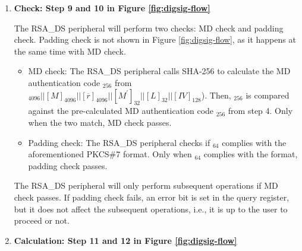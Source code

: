 \documentclass[main\_\_EN.tex]{subfiles}
\begin{document}
\begin{enumerate}
    \item {\bfseries Check: Step 9 and 10 in Figure \ref{fig:digsig-flow}}

        The RSA\_DS peripheral will perform two checks: MD check and padding check. Padding check is not shown in Figure \ref{fig:digsig-flow}, as it happens at the same time with MD check.


        \begin{itemize}

            \item MD check: The RSA\_DS peripheral calls SHA-256 to calculate the MD authentication code \begin{math}[CALC\_MD]_{256}\end{math} from \begin{math}
                [Y]_{4096} ||
                [M]_{4096} ||
                [\overline{r}]_{4096} ||
                [M^{\prime}]_{32} ||
                [L]_{32} ||
                [IV]_{128}
            \end{math}). Then, \begin{math}[CALC\_MD]_{256}\end{math} is compared against the pre-calculated MD authentication code \begin{math}[MD]_{256}\end{math} from step 4. Only when the two match, MD check passes.

            \item Padding check: The RSA\_DS peripheral checks if \begin{math}[\beta]_{64} \end{math} complies with the aforementioned PKCS\#7 format. Only when \begin{math}[\beta]_{64} \end{math} complies with the format, padding check passes.

        \end{itemize}

        The RSA\_DS peripheral will only perform subsequent operations if MD check passes. If padding check fails, an error bit is set in the query register, but it does not affect the subsequent operations, i.e., it is up to the user to proceed or not.

    \item {\bfseries Calculation: Step 11 and 12 in Figure \ref{fig:digsig-flow}}


\end{enumerate}
\end{document}
